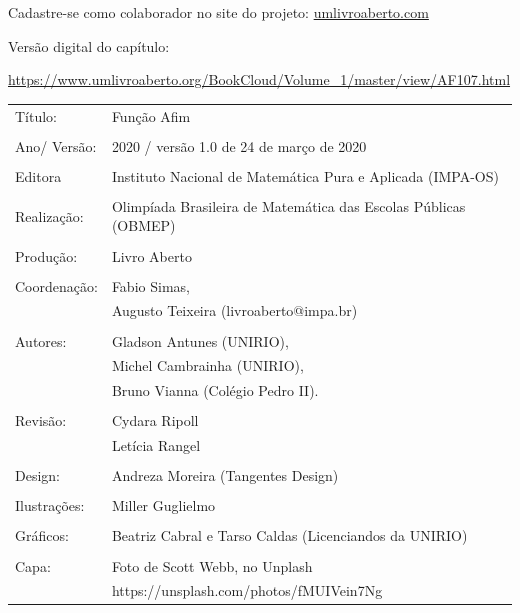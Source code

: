 \vspace*{.3cm}

Cadastre-se como colaborador no site do projeto: \url{umlivroaberto.com}

Versão digital do capítulo:

\url{https://www.umlivroaberto.org/BookCloud/Volume_1/master/view/AF107.html}


\begin{tabular}{p{}p{}}
Título: & Função Afim\\
\\
Ano/ Versão: & 2020 / versão 1.0 de 24 de março de 2020\\
\\
Editora & Instituto Nacional de Matem\'atica Pura e Aplicada (IMPA-OS)\\
\\
Realização:& Olimp\'iada Brasileira de Matem\'atica das Escolas P\'ublicas (OBMEP)\\
\\
Produção:& Livro Aberto\\
\\
Coordenação:& Fabio Simas, \\
            & Augusto Teixeira (livroaberto@impa.br)\\
\\
  Autores: & Gladson Antunes (UNIRIO),\\
        & Michel Cambrainha (UNIRIO),\\
             & Bruno Vianna (Colégio Pedro II).\\
\\
Revisão: &  Cydara Ripoll  \\
         &  Letícia Rangel \\
\\
Design: & Andreza Moreira (Tangentes Design) \\
\\
  Ilustrações: & Miller  Guglielmo \\ 
\\
Gráficos: & Beatriz Cabral e Tarso Caldas (Licenciandos da UNIRIO)\\
\\
  Capa: & Foto de Scott Webb, no Unplash \\
        & https://unsplash.com/photos/fMUIVein7Ng \\

\end{tabular}
\vspace{.5cm}


